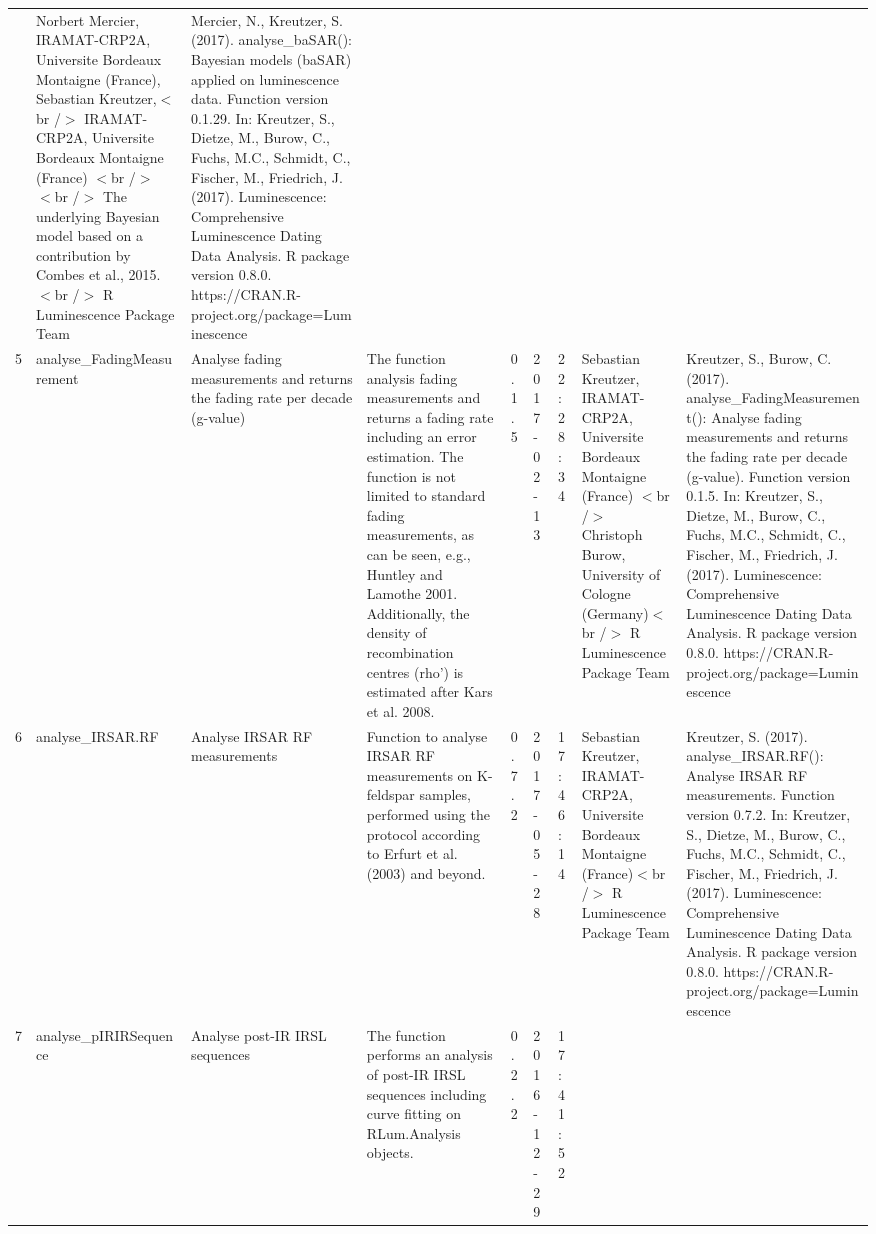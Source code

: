 \begin{table}[ht]
\begin{tabular}{rllllllll}
 & Norbert Mercier, IRAMAT-CRP2A, Universite Bordeaux Montaigne (France), Sebastian Kreutzer,$<$br /$>$ IRAMAT-CRP2A, Universite Bordeaux Montaigne (France)  $<$br /$>$ $<$br /$>$ The underlying Bayesian model based on a contribution by Combes et al., 2015.$<$br /$>$  R Luminescence Package Team & Mercier, N., Kreutzer, S. (2017). analyse\_baSAR(): Bayesian models (baSAR) applied on luminescence data. Function version 0.1.29. In: Kreutzer, S., Dietze, M., Burow, C., Fuchs, M.C., Schmidt, C., Fischer, M., Friedrich, J. (2017). Luminescence: Comprehensive Luminescence Dating Data Analysis. R package version 0.8.0. https://CRAN.R-project.org/package=Luminescence
 \\ 
  5 & analyse\_FadingMeasurement & Analyse fading measurements and returns the fading rate per decade (g-value) & The function analysis fading measurements and returns a fading rate including an error estimation. The function is not limited to standard fading measurements, as can be seen, e.g., Huntley and Lamothe 2001. Additionally, the density of recombination centres (rho') is estimated after Kars et al. 2008. & 0.1.5 & 2017-02-13 & 22:28:34
 & Sebastian Kreutzer, IRAMAT-CRP2A, Universite Bordeaux Montaigne (France)  $<$br /$>$ Christoph Burow, University of Cologne (Germany)$<$br /$>$  R Luminescence Package Team & Kreutzer, S., Burow, C. (2017). analyse\_FadingMeasurement(): Analyse fading measurements and returns the fading rate per decade (g-value). Function version 0.1.5. In: Kreutzer, S., Dietze, M., Burow, C., Fuchs, M.C., Schmidt, C., Fischer, M., Friedrich, J. (2017). Luminescence: Comprehensive Luminescence Dating Data Analysis. R package version 0.8.0. https://CRAN.R-project.org/package=Luminescence
 \\ 
  6 & analyse\_IRSAR.RF & Analyse IRSAR RF measurements & Function to analyse IRSAR RF measurements on K-feldspar samples, performed using the protocol according to Erfurt et al. (2003) and beyond. & 0.7.2 & 2017-05-28 & 17:46:14
 & Sebastian Kreutzer, IRAMAT-CRP2A, Universite Bordeaux Montaigne (France)$<$br /$>$  R Luminescence Package Team & Kreutzer, S. (2017). analyse\_IRSAR.RF(): Analyse IRSAR RF measurements. Function version 0.7.2. In: Kreutzer, S., Dietze, M., Burow, C., Fuchs, M.C., Schmidt, C., Fischer, M., Friedrich, J. (2017). Luminescence: Comprehensive Luminescence Dating Data Analysis. R package version 0.8.0. https://CRAN.R-project.org/package=Luminescence
 \\ 
  7 & analyse\_pIRIRSequence & Analyse post-IR IRSL sequences & The function performs an analysis of post-IR IRSL sequences including curve fitting on  RLum.Analysis  objects. & 0.2.2 & 2016-12-29 & 17:41:52

\end{tabular}
\end{table}
